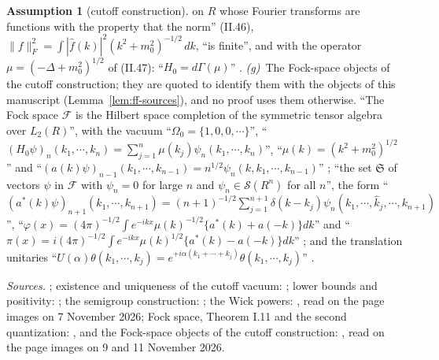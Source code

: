 \documentclass[11pt,a4paper]{article}
\theoremstyle{plain}
\theoremstyle{definition}
\newtheorem{assumption}{Assumption}
\theoremstyle{plain}
\theoremstyle{definition}
\begin{document}
\begin{assumption}[cutoff construction]
on $R$ whose Fourier transforms are functions with the property that the norm'' (II.46),
$\|f\|_F^2=\int|\hat f(k)|^2(k^2+m_0^2)^{-1/2}\,dk$, ``is finite'', and with the operator
$\mu=(-\Delta+m_0^2)^{1/2}$ of (II.47): ``$H_0=d\Gamma(\mu)$'' \cite[Thm.~II.17,
(II.46)--(II.48), pp.~78--79]{SimonBook}.
\emph{(g)}~The Fock-space objects of the cutoff construction; they are quoted to identify
them with the objects of this manuscript (Lemma~\ref{lem:ff-sources}), and no proof uses them
otherwise.  ``The Fock space $\mathcal F$ is the Hilbert space completion of the symmetric
tensor algebra over $L_2(R)$'', with the vacuum ``$\Omega_0=\{1,0,0,\cdots\}$'',
``$(H_0\psi)_n(k_1,\cdots,k_n)=\sum_{j=1}^n\mu(k_j)\psi_n(k_1,\cdots,k_n)$'',
``$\mu(k)=(k^2+m_0^2)^{1/2}$'' and ``$(a(k)\psi)_{n-1}(k_1,\cdots,k_{n-1})=n^{1/2}\psi_n(k,k_1,
\cdots,k_{n-1})$'' \cite[(1.2.1)--(1.2.6), p.~364]{GJ2}; ``the set $\mathfrak S$ of vectors
$\psi$ in $\mathcal F$ with $\psi_n=0$ for large $n$ and $\psi_n\in\mathcal S(R^n)$ for all
$n$'', the form ``$(a^*(k)\psi)_{n+1}(k_1,\cdots,k_{n+1})=(n+1)^{-1/2}\sum_{j=1}^{n+1}
\delta(k-k_j)\psi_n(k_1,\cdots,\hat k_j,\cdots,k_{n+1})$'', ``$\varphi(x)=(4\pi)^{-1/2}\int
e^{-ikx}\mu(k)^{-1/2}\{a^*(k)+a(-k)\}dk$'' and ``$\pi(x)=i(4\pi)^{-1/2}\int e^{-ikx}\mu(k)^{1/2}
\{a^*(k)-a(-k)\}dk$'' \cite[(1.2.7), (1.2.10), (1.2.11), p.~365]{GJ2}; and the translation
unitaries ``$U(\alpha)\theta(k_1,\cdots,k_j)=e^{+i\alpha(k_1+\cdots+k_j)}\theta(k_1,\cdots,k_j)$''
\cite[(3.6.2), p.~398]{GJ2}.

\emph{Sources.} \cite[p.~588]{GJS}; existence and uniqueness of the cutoff vacuum:
\cite[Thms.~2.2.1, 2.3.1]{GJ2}; lower bounds and positivity: \cite{GJ71}; the semigroup
construction: \cite[Thm.~5.3]{Rosen70}; the Wick powers: \cite[pp.~10--12, 15--17,
134--138]{SimonBook}, read on the page images on 7 November 2026; Fock space, Theorem I.11
and the second quantization: \cite[pp.~23--24, 27, 31--32, 78--79]{SimonBook}, and the
Fock-space objects of the cutoff construction: \cite[pp.~364--365, 398]{GJ2}, read on the page
images on 9 and 11 November 2026.


\end{assumption}
\end{document}
